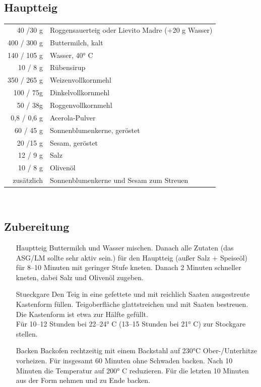  
\subsection*{Hauptteig}
\begin{tabular}{r l}
          40 /30 g & Roggensauerteig oder Lievito Madre (+20 g Wasser) \\
         400 / 300 g & Buttermilch, kalt                                 \\
         140 / 105 g & Wasser, 40° C                                     \\
          10 / 8 g & Rübensirup                                        \\
         350 / 265 g & Weizenvollkornmehl                                \\
         100 / 75g & Dinkelvollkornmehl                                \\
          50 / 38g & Roggenvollkornmehl                                \\
         0,8 / 0,6 g & Acerola-Pulver                                    \\
          60 / 45 g & Sonnenblumenkerne, geröstet                       \\
          20 /15 g & Sesam, geröstet                                   \\
          12 / 9 g & Salz                                              \\
          10 / 8 g & Olivenöl                                          \\
    zusätzlich & Sonnenblumenkerne und Sesam zum Streuen
\end{tabular}\\

\subsection*{Zubereitung}

\begin{enumerate}
    \item [\Gls{Hauptteig}]  Buttermilch und Wasser mischen. Danach alle Zutaten (das ASG/LM sollte sehr aktiv sein.) für den Hauptteig (außer Salz + Speiseöl) für 8–10 Minuten mit geringer Stufe kneten. Danach 2 Minuten schneller kneten, dabei Salz und Olivenöl zugeben. 
    \item [\Gls{Stueckgare}] 
    Den Teig in eine gefettete und mit reichlich Saaten ausgestreute Kastenform füllen. Teigoberfläche glattstreichen und mit Saaten bestreuen. Die Kastenform ist etwa zur Hälfte gefüllt.\\
    Für 10–12 Stunden bei 22–24° C (13–15 Stunden bei 21° C) zur Stockgare stellen. 
    \item[\Gls{Backen}]
    Backofen rechtzeitig mit einem Backstahl auf 230°C Ober-/Unterhitze vorheizen. Für insgesamt 60 Minuten ohne Schwaden backen. Nach 10 Minuten die Temperatur auf 200° C reduzieren. Für die letzten 10 Minuten aus der Form nehmen und zu Ende backen.
\end{enumerate}

